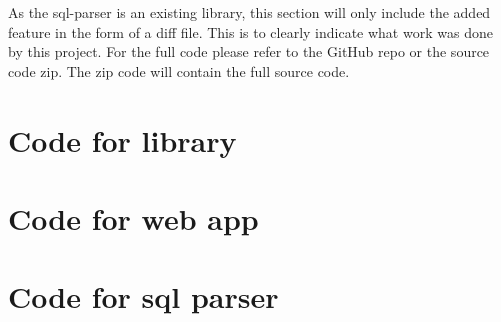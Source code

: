 As the sql-parser is an existing library, this section will only include the added feature in the form of a diff file. This is to clearly indicate what work was done by this project. For the full code please refer to the GitHub repo or the source code zip. The zip code will contain the full source code.

\section{Code for library}

\section{Code for web app}

\section{Code for sql parser}

